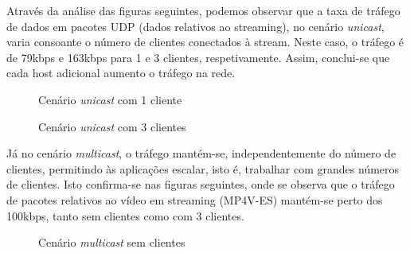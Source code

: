 \documentclass[a4paper, 11pt]{article}
\begin{document}
Através da análise das figuras seguintes, podemos observar que a taxa de tráfego de dados em pacotes UDP (dados relativos ao streaming), no cenário \textit{unicast}, varia consoante o número de clientes conectados à stream. Neste caso, o tráfego é de 79kbps e 163kbps para 1 e 3 clientes, respetivamente. Assim, conclui-se que cada host adicional aumento o tráfego na rede.

\begin{figure}[H]
    \centering
    \caption{Cenário \textit{unicast} com 1 cliente}
\end{figure}

\begin{figure}[H]
    \centering
    \caption{Cenário \textit{unicast} com 3 clientes}
\end{figure}

Já no cenário \textit{multicast}, o tráfego mantém-se, independentemente do número de clientes, permitindo às aplicações escalar, isto é, trabalhar com grandes números de clientes. Isto confirma-se nas figuras seguintes, onde se observa que o tráfego de pacotes relativos ao vídeo em streaming (MP4V-ES) mantém-se perto dos 100kbps, tanto sem clientes como com 3 clientes.

\begin{figure}[H]
    \centering
    \caption{Cenário \textit{multicast} sem clientes}
\end{figure}
\end{document}

